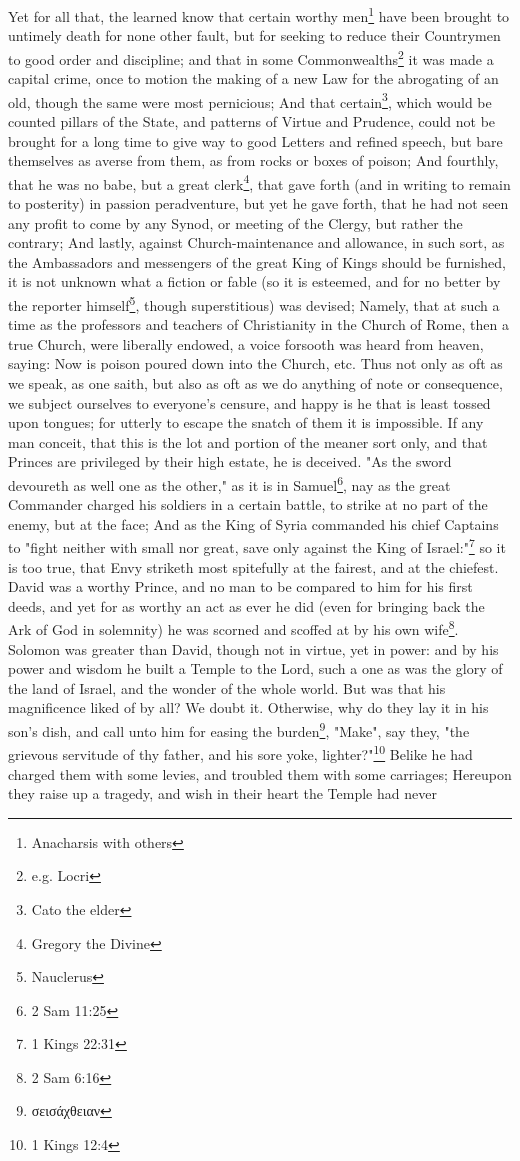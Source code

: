 Yet for all that, the learned know that certain worthy men\footnote{Anacharsis with others} have been brought to untimely death for none other fault, but for seeking to reduce their Countrymen to good order and discipline; and that in some Commonwealths\footnote{e.g. Locri} it was made a capital crime, once to motion the making of a new Law for the abrogating of an old, though the same were most pernicious; And that certain\footnote{Cato the elder}, which would be counted pillars of the State, and patterns of Virtue and Prudence, could not be brought for a long time to give way to good Letters and refined speech, but bare themselves as averse from them, as from rocks or boxes of poison; And fourthly, that he was no babe, but a great clerk\footnote{Gregory the Divine}, that gave forth (and in writing to remain to posterity) in passion peradventure, but yet he gave forth, that he had not seen any profit to come by any Synod, or meeting of the Clergy, but rather the contrary; And lastly, against Church-maintenance and allowance, in such sort, as the Ambassadors and messengers of the great King of Kings should be furnished, it is not unknown what a fiction or fable (so it is esteemed, and for no better by the reporter himself\footnote{Nauclerus}, though superstitious) was devised; Namely, that at such a time as the professors and teachers of Christianity in the Church of Rome, then a true Church, were liberally endowed, a voice forsooth was heard from heaven, saying: Now is poison poured down into the Church, etc. Thus not only as oft as we speak, as one saith, but also as oft as we do anything of note or consequence, we subject ourselves to everyone's censure, and happy is he that is least tossed upon tongues; for utterly to escape the snatch of them it is impossible. If any man conceit, that this is the lot and portion of the meaner sort only, and that Princes are privileged by their high estate, he is deceived. "As the sword devoureth as well one as the other," as it is in Samuel\footnote{2 Sam 11:25}, nay as the great Commander charged his soldiers in a certain battle, to strike at no part of the enemy, but at the face; And as the King of Syria commanded his chief Captains to "fight neither with small nor great, save only against the King of Israel:"\footnote{1 Kings 22:31} so it is too true, that Envy striketh most spitefully at the fairest, and at the chiefest. David was a worthy Prince, and no man to be compared to him for his first deeds, and yet for as worthy an act as ever he did (even for bringing back the Ark of God in solemnity) he was scorned and scoffed at by his own wife\footnote{2 Sam 6:16}. Solomon was greater than David, though not in virtue, yet in power: and by his power and wisdom he built a Temple to the Lord, such a one as was the glory of the land of Israel, and the wonder of the whole world. But was that his magnificence liked of by all? We doubt it. Otherwise, why do they lay it in his son's dish, and call unto him for easing the burden\footnote{\foreignlanguage{greek}{σεισάχθειαν}}, "Make", say they, "the grievous servitude of thy father, and his sore yoke, lighter?"\footnote{1 Kings 12:4} Belike he had charged them with some levies, and troubled them with some carriages; Hereupon they raise up a tragedy, and wish in their heart the Temple had never 